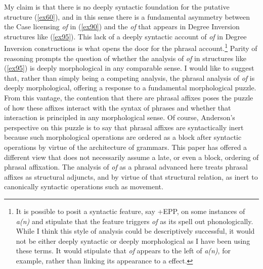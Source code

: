\documentclass[output=paper,
modfonts
]{LSP/langsci}
\begin{document}
My claim is that there is no deeply syntactic foundation for the putative structure ({\ref{ex60}}), and in this sense there is a fundamental asymmetry between the Case licensing {\textit{of}} in ({\ref{ex90}}) and the {\textit{of}} that appears in Degree Inversion structures like ({\ref{ex95}}).  This lack of a deeply syntactic account of {\textit{of}} in Degree Inversion constructions is what opens the door for the phrasal  account.{\footnote{It is possible to posit a syntactic feature, say +EPP, on some instances of {\textit{a(n)}} and stipulate that the feature triggers {\textit{of}} as its spell out phonologically.  While I think this style of analysis could be descriptively successful, it would not be either deeply syntactic or deeply morphological as I have been using these terms.  It would stipulate that {\textit{of}} appears to the left of {\textit{a(n)}}, for example, rather than linking its appearance to a  effect.}} Parity of reasoning prompts the question of whether the analysis of {\textit{of}} in  structures like ({\ref{ex95}}) is deeply morphological in any comparable sense.  I would like to suggest that, rather than simply being a competing analysis, the phrasal  analysis of {\textit{of}} is deeply morphological, offering a response to a fundamental morphological puzzle.   From this vantage, the contention that there are phrasal affixes poses the puzzle of how these affixes interact with the syntax of phrases and whether that interaction is principled in any morphological sense. Of course, Anderson's perspective on this puzzle is to say that phrasal affixes are syntactically inert because such morphological operations are ordered as a block after syntactic operations by virtue of the architecture of grammars.  This paper has offered a different view that does not necessarily assume a late, or even a block, ordering of phrasal affixation.  The analysis of {\textit{of}} as a phrasal  advanced here treats phrasal affixes as structural adjuncts, and by virtue of that structural relation, as inert to canonically syntactic operations such as movement.  
\end{document}
